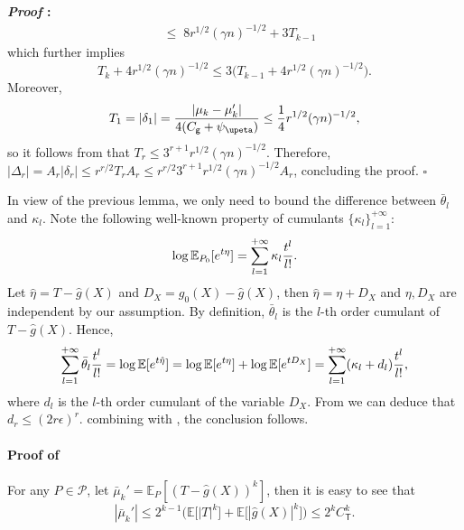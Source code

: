 \documentclass{article}
\def\eps{{\epsilon}}
\def\gP{{\mathcal{P}}}
\newcommand{\E}{\mathbb{E}}
\renewenvironment{proof}{\noindent\textbf{\textit{Proof }:}}{\hfill$\square$}
\begin{document}
\begin{proof}
\begin{equation}
\begin{aligned}
        &\leq\; 8r^{1/2}(\gamma n)^{-1/2}  + 3T_{k-1}
    \end{aligned}
\end{equation}
which further implies
\begin{equation}
    \label{eq:Tk-recursion}
    T_k + 4 r^{1/2}(\gamma n)^{-1/2} \leq 3\big(T_{k-1} + 4 r^{1/2}(\gamma n)^{-1/2} \big).
\end{equation}
Moreover,
\begin{equation}
    \notag
    T_1 = |\delta_1| = \frac{|\mu_k-\mu_k'|}{4(C_{\mathsf{g}}+\psi_{\upeta})} \leq \frac{1}{4} r^{1/2}(\gamma n)^{-1/2},
\end{equation}
so it follows from  that $T_r \leq 3^{r+1} r^{1/2}(\gamma n)^{-1/2}$. Therefore, $|\Delta_r|=A_r|\delta_r|\leq r^{r/2} T_r A_r \leq r^{r/2}3^{r+1} r^{1/2}(\gamma n)^{-1/2}A_r$, concluding the proof.
\end{proof}



In view of the previous lemma, we only need to bound the difference between $\bar{\theta}_l$ and $\kappa_l$. Note the following well-known property of cumulants $\{\kappa_l\}_{l=1}^{+\infty}$: 
\begin{equation}
    \notag
    \log \E_{P_0}[e^{t\eta}] = \sum_{l=1}^{+\infty} \kappa_l\frac{t^l}{l!}.
\end{equation}
Let $\hat{\eta}=T-\hat{g}(X)$ and $D_X = g_0(X)-\hat{g}(X)$, then $\hat{\eta}=\eta+D_X$ and $\eta, D_X$ are independent by our assumption. By definition, $\bar{\theta}_l$ is the $l$-th order cumulant of $T-\hat{g}(X)$. Hence,
\begin{equation}
    \notag
    \sum_{l=1}^{+\infty} \bar{\theta}_l\frac{t^l}{l!} = \log\E[e^{t\hat{\eta}}] = \log\E[e^{t\eta}] + \log\E[ e^{tD_X}] = \sum_{l=1}^{+\infty} (\kappa_l+d_l)\frac{t^l}{l!},
\end{equation}
where $d_l$ is the $l$-th order cumulant of the variable $D_X$. From  we can deduce that $d_r \leq (2r\eps)^r$. combining with , the conclusion follows.

\paragraph{Proof of }
For any $P\in\gP$, let $\bar{\mu}_k' = \E_{P}[(T-\hat{g}(X))^k]$, then it is easy to see that
\begin{equation}
    \label{mu-k-bar-bound-general}
    |\bar{\mu}_k'| \leq 2^{k-1} \big(\E\big[|T|^k\big] + \E\big[|\hat{g}(X)|^k\big]\big) \leq 2^{k}C_{\mathsf{T}}^k.
\end{equation}
\end{document}
